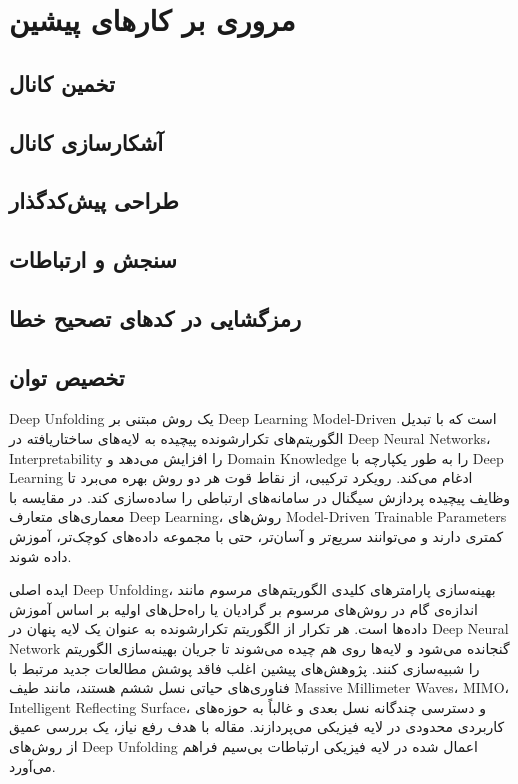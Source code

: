 \chapter{مروری بر کارهای پیشین}
\label{chap:related}
\section{تخمین کانال}

\section{آشکارسازی کانال}
\section{طراحی پیش‌کدگذار}
\section{سنجش و ارتباطات}
\section{رمزگشایی در کدهای تصحیح خطا}
\section{تخصیص توان}

\gls{Deep Unfolding}
یک روش مبتنی بر 
\gls{Deep Learning} 
\gls{Model-Driven}
است که با تبدیل الگوریتم‌های تکرارشونده پیچیده به لایه‌های ساختاریافته در
\glspl{Deep Neural Network}، 
\gls{Interpretability}
 را افزایش می‌دهد و 
\gls{Domain Knowledge}
 را به طور یکپارچه با 
\gls{Deep Learning}
  ادغام می‌کند.  رویکرد ترکیبی، از نقاط قوت هر دو روش بهره می‌برد تا وظایف پیچیده پردازش سیگنال در سامانه‌های ارتباطی را ساده‌سازی کند. در مقایسه با معماری‌های متعارف 
\gls{Deep Learning}،
 روش‌های 
\gls{Model-Driven}
\glspl{Trainable Parameter}
کمتری دارند و می‌توانند سریع‌تر و آسان‌تر، حتی با مجموعه داده‌های کوچک‌تر، آموزش داده شوند.

 ایده اصلی 
\gls{Deep Unfolding}،
 بهینه‌سازی پارامترهای کلیدی الگوریتم‌های مرسوم مانند اندازه‌ی گام در روش‌های مرسوم بر گرادیان یا راه‌حل‌های اولیه بر اساس آموزش داده‌ها است. هر تکرار از الگوریتم تکرارشونده به عنوان یک لایه پنهان در 
\gls{Deep Neural Network}
  گنجانده می‌شود و  لایه‌ها روی هم چیده می‌شوند تا جریان بهینه‌سازی الگوریتم را شبیه‌سازی کنند.
 پژوهش‌های پیشین اغلب فاقد پوشش مطالعات جدید مرتبط با فناوری‌های حیاتی نسل ششم هستند، مانند طیف 
\glspl{Massive Millimeter Wave}،
\gls{MIMO}،
\gls{Intelligent Reflecting Surface}،
     و دسترسی چندگانه نسل بعدی و غالباً به حوزه‌های کاربردی محدودی در لایه فیزیکی می‌پردازند.  مقاله با هدف رفع  نیاز، یک بررسی عمیق از روش‌های 
\gls{Deep Unfolding}
      اعمال شده در لایه فیزیکی ارتباطات بی‌سیم فراهم می‌آورد.
      
